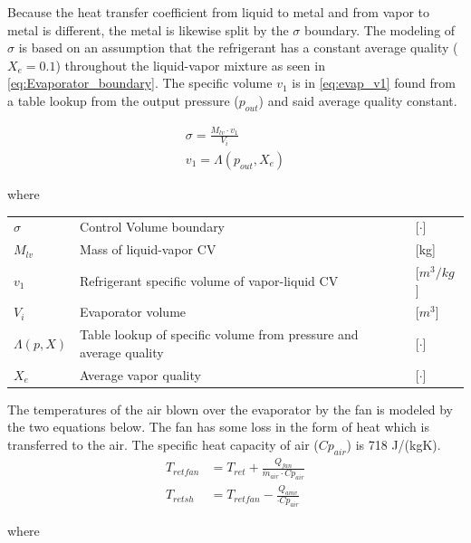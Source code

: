 Because the heat transfer coefficient from liquid to metal and from vapor to metal is different, the metal is likewise split by the $\sigma$ boundary. The modeling of $\sigma$ is based on an assumption that the refrigerant has a constant average quality ($X_e = 0.1$) throughout the liquid-vapor mixture as seen in \cref{eq:Evaporator_boundary}. The specific volume $v_1$ is in \cref{eq:evap_v1} found from a table lookup from the output pressure ($p_{out}$) and said average quality constant.

\begin{align}
	\sigma = \frac{M_{lv} \cdot v_1}{V_i} \label{eq:Evaporator_boundary} \\
	v_1 = \Lambda(p_{out},X_e) \label{eq:evap_v1}
\end{align}

where
\smallskip
\begin{center}
	\begin{tabular}{l p{10cm} l}
		$\sigma$       & Control Volume boundary                                           & [$\cdot$]            \\
		$M_{lv}$       & Mass of liquid-vapor CV                                           & [\si{kg}]            \\
		$v_1$          & Refrigerant specific volume of vapor-liquid CV                    & [$\si{m}^3/\si{kg}$] \\
		$V_i$          & Evaporator volume                                                 & [$\si{m}^3$]         \\
		$\Lambda(p,X)$ & Table lookup of specific volume from pressure and average quality & [$\cdot$] \\
		$ X_e $        & Average vapor quality                                             & [$\cdot$]
	\end{tabular}
\end{center}
\medskip
The temperatures of the air blown over the evaporator by the fan is modeled by the two equations below. The fan has some loss in the form of heat which is transferred to the air. The specific heat capacity of air ($Cp_{air}$) is 718 \si{J}/(\si{kg}\si{K}).
\begin{align}
	T_{retfan} 		& = T_{ret} + \frac{Q_{fan}}{\dot{m}_{air} \cdot Cp_{air}} 		\label{eq:T_retfan} 		\\
	T_{retsh} 		& = T_{retfan} - \frac{Q_{amv}}{ \cdot Cp_{air}} 	\label{eq:T_retsh}
\end{align}

where


